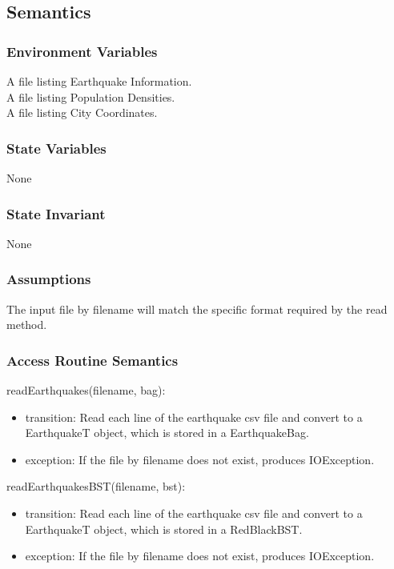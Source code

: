 \documentclass[12pt]{article}
\begin{document}
\subsection* {Semantics}

\subsubsection* {Environment Variables}

A file listing Earthquake Information.\\
A file listing Population Densities.\\
A file listing City Coordinates.

\subsubsection* {State Variables}

None

\subsubsection* {State Invariant}

None

\subsubsection* {Assumptions}

The input file by filename will match the specific format required by the read method.

\subsubsection* {Access Routine Semantics}

\noindent readEarthquakes(filename, bag):
\begin{itemize}
\item transition: Read each line of the earthquake csv file and convert to a EarthquakeT object, which is stored in a EarthquakeBag.
\item exception: If the file by filename does not exist, produces IOException.
\end{itemize}

\noindent readEarthquakesBST(filename, bst):
\begin{itemize}
\item transition: Read each line of the earthquake csv file and convert to a EarthquakeT object, which is stored in a RedBlackBST.
\item exception: If the file by filename does not exist, produces IOException.
\end{itemize}
\end{document}
